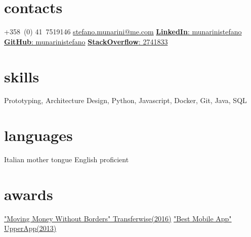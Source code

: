 \documentclass[]{friggeri-cv}
\begin{document}


\begin{aside}
\section{contacts}
+358 (0) 41 7519146
\href{mailto:stefano.munarini@me.com}{stefano.munarini@me.com}
\href{https://it.linkedin.com/in/munarinistefano}{\textbf{LinkedIn}:
munarinistefano}
\href{https://github.com/stefanomunarini}{\textbf{GitHub}:
munarinistefano}
\href{http://stackexchange.com/users/2741833/stefano-munarini}{\textbf{StackOverflow}:
2741833}
\section{skills}
Prototyping,
Architecture Design,
Python, Javascript,
Docker, Git,
Java, SQL
\section{languages}
Italian mother tongue
English proficient
\section{awards}
\href{https://devpost.com/software/donatewise}{"Moving Money Without Borders" Transferwise(2016)}
\href{http://www.wired.it/mobile/app/2013/12/17/upperapp-migliori-app-studenti/}{"Best Mobile App" UpperApp(2013)}
\end{aside}

\end{document}
